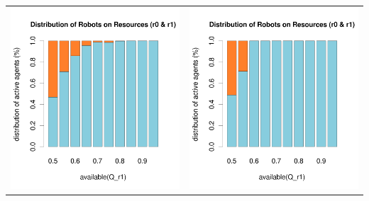 \documentclass[a4paper,10pt]{article}
\begin{document}
\begin{table}[H]
\begin{tabular}{cc}
\includegraphics[width=\imgSize]{../images/5StaticEnv/barplotAliveR1AndR2_mean_env0_normalized}& \includegraphics[width=\imgSize]{../images/5StaticEnv/barplotAliveR1AndR2_median_env0_normalized}\\
\end{tabular}
\end{table}
\end{document}
